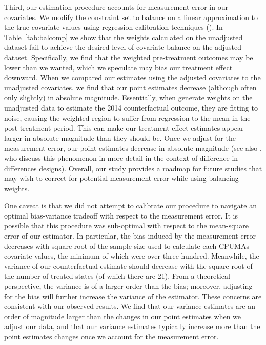 Third, our estimation procedure accounts for measurement error in our covariates. We modify the constraint set to balance on a linear approximation to the true covariate values using regression-calibration techniques (\cite{gleser1992importance}). In Table~\ref{tab:balcomp} we show that the weights calculated on the unadjusted dataset fail to achieve the desired level of covariate balance on the adjusted dataset. Specifically, we find that the weighted pre-treatment outcomes may be lower than we wanted, which we speculate may bias our treatment effect downward. When we compared our estimates using the adjusted covariates to the unadjusted covariates, we find that our point estimates decrease (although often only slightly) in absolute magnitude. Essentially, when generate weights on the unadjusted data to estimate the 2014 counterfactual outcome, they are fitting to noise, causing the weighted region to suffer from regression to the mean in the post-treatment period. This can make our treatment effect estimates appear larger in absolute magnitude than they should be. Once we adjust for the measurement error, our point estimates decrease in absolute magnitude (see also \cite{daw2018matching}, who discuss this phenomenon in more detail in the context of difference-in-differences designs). Overall, our study provides a roadmap for future studies that may wish to correct for potential measurement error while using balancing weights. 

One caveat is that we did not attempt to calibrate our procedure to navigate an optimal bias-variance tradeoff with respect to the measurement error. It is possible that this procedure was sub-optimal with respect to the mean-square error of our estimator. In particular, the bias induced by the measurement error decreases with square root of the sample size used to calculate each CPUMAs covariate values, the minimum of which were over three hundred. Meanwhile, the variance of our counterfactual estimate should decrease with the square root of the number of treated states (of which there are 21). From a theoretical perspective, the variance is of a larger order than the bias; moreover, adjusting for the bias will further increase the variance of the estimator. These concerns are consistent with our observed results. We find that our variance estimates are an order of magnitude larger than the changes in our point estimates when we adjust our data, and that our variance estimates typically increase more than the point estimates changes once we account for the measurement error. 

